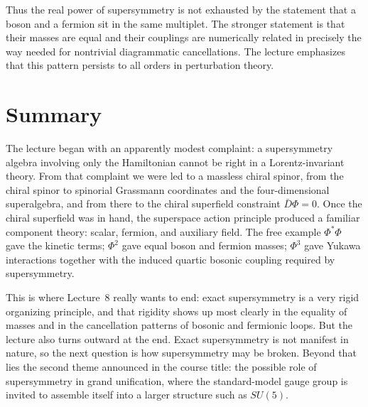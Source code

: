 Thus the real power of supersymmetry is not exhausted by the statement that a boson and a fermion sit in the same multiplet. The stronger statement is that their masses are equal and their couplings are numerically related in precisely the way needed for nontrivial diagrammatic cancellations. The lecture emphasizes that this pattern persists to all orders in perturbation theory.

\section{Summary}

The lecture began with an apparently modest complaint: a supersymmetry algebra involving only the Hamiltonian cannot be right in a Lorentz-invariant theory. From that complaint we were led to a massless chiral spinor, from the chiral spinor to spinorial Grassmann coordinates and the four-dimensional superalgebra, and from there to the chiral superfield constraint \(\bar D\Phi=0\). Once the chiral superfield was in hand, the superspace action principle produced a familiar component theory: scalar, fermion, and auxiliary field. The free example \(\Phi^\ast\Phi\) gave the kinetic terms; \(\Phi^2\) gave equal boson and fermion masses; \(\Phi^3\) gave Yukawa interactions together with the induced quartic bosonic coupling required by supersymmetry.

This is where Lecture~8 really wants to end: exact supersymmetry is a very rigid organizing principle, and that rigidity shows up most clearly in the equality of masses and in the cancellation patterns of bosonic and fermionic loops. But the lecture also turns outward at the end. Exact supersymmetry is not manifest in nature, so the next question is how supersymmetry may be broken. Beyond that lies the second theme announced in the course title: the possible role of supersymmetry in grand unification, where the standard-model gauge group is invited to assemble itself into a larger structure such as \(SU(5)\).